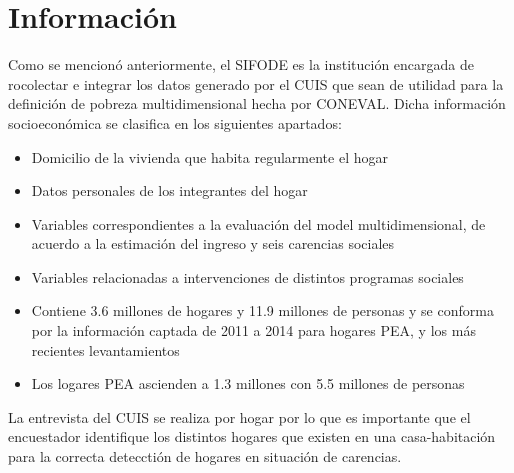 \section{Información}
Como se mencionó anteriormente, el SIFODE es la institución encargada de rocolectar e integrar los datos generado por el CUIS que sean de utilidad para la definición de pobreza multidimensional hecha por CONEVAL. Dicha información socioeconómica se clasifica en los siguientes apartados:
\begin{itemize}
    \item Domicilio de la vivienda que habita regularmente el hogar
    \item Datos personales de los integrantes del hogar
    \item Variables correspondientes a la evaluación del model multidimensional, de acuerdo a la estimación del ingreso y seis carencias sociales
    \item Variables relacionadas a intervenciones de distintos programas sociales
    \item Contiene 3.6 millones de hogares y 11.9 millones de personas y se conforma por la información captada de 2011 a 2014 para hogares PEA, y los más recientes levantamientos
    \item Los logares PEA ascienden a 1.3 millones con 5.5 millones de personas
\end{itemize}

La entrevista del CUIS se realiza por hogar por lo que es importante que el encuestador identifique los distintos hogares que existen en una casa-habitación para la correcta detecctión de hogares en situación de carencias.\\

